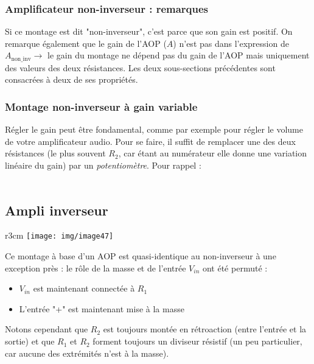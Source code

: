 \subsubsection{Amplificateur non-inverseur : remarques}
Si ce montage est dit "non-inverseur", c'est parce que son gain est positif. On remarque également que le gain de l'AOP ($A$) n'est pas dans l'expression de $A_{\text{non\_inv}} \rightarrow$ le gain du montage ne dépend pas du gain de l'AOP mais uniquement des valeurs des deux résistances. Les deux sous-sections précédentes sont consacrées à deux de ses propriétés.

\subsubsection{Montage non-inverseur à gain variable}
Régler le gain peut être fondamental, comme par exemple pour régler le volume de votre amplificateur audio. Pour se faire, il suffit de remplacer une des deux résistances (le plus souvent $R_2$, car étant au numérateur elle donne une variation linéaire du gain) par un \textit{potentiomètre}. Pour rappel :\\

\ \\




\subsection{Ampli inverseur}
\begin{wrapfigure}[7]{r}{3cm}
\texttt{[image: img/image47]}
\end{wrapfigure}
Ce montage à base d'un AOP est quasi-identique au non-inverseur à une exception près : le rôle de la masse et de l'entrée $V_{in}$ ont été permuté :
\begin{itemize}
\item $V_{in}$ est maintenant connectée à $R_1$
\item L'entrée "+" est maintenant mise à la masse
\end{itemize}
Notons cependant que $R_2$ est toujours montée en rétroaction (entre l'entrée et la sortie) et que $R_1$ et $R_2$ forment toujours un diviseur résistif (un peu particulier, car aucune des extrémités n'est à la masse).

